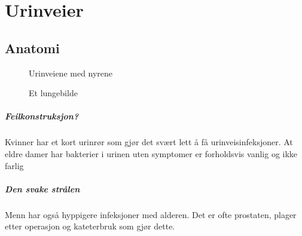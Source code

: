 \chapter{Urinveier}%
		\section{Anatomi}
					\begin{figure}[ht]
                      \centering
                      \caption{Et lungebilde}
                      {Urinveiene med nyrene}%
                    \end{figure}
			\paragraph{Feilkonstruksjon?\\}
				Kvinner har et kort urinrør som gjør det svært lett å få urinveisinfeksjoner. At eldre damer har bakterier i urinen uten symptomer er forholdsvis vanlig og ikke farlig\cite{uti-old}
			\paragraph{Den svake strålen\\}
				Menn har også hyppigere infeksjoner med alderen. Det er ofte prostaten, plager etter operasjon og kateterbruk som gjør dette. 
